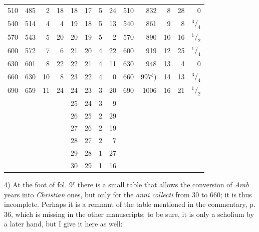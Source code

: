 \documentclass[11pt]{article}
\newcommand{\Pg}[1]{\marginpar{\footnotesize\color{gray}#1}}
\begin{document}
\begin{center}
\begin{tabular}{rrrr|rrrr|rrrrr}
510 & 485 & 2 & 18 & 18 & 17 & 5 & 24 & 510 & 832 & 8 & 28 & 0 \\
540 & 514 & 4 & 4 & 19 & 18 & 5 & 13 & 540 & 861 & 9 & 8 & $^{3}/_{4}$ \\
570 & 543 & 5 & 20 & 20 & 19 & 5 & 2 & 570 & 890 & 10 & 16 & $^{1}/_{2}$ \\
600 & 572 & 7 & 6 & 21 & 20 & 4 & 22 & 600 & 919 & 12 & 25 & $^{1}/_{4}$ \\
630 & 601 & 8 & 22 & 22 & 21 & 4 & 11 & 630 & 948 & 13 & 4 & 0 \\
660 & 630 & 10 & 8 & 23 & 22 & 4 & 0 & 660 & 997$^{b}$) & 14 & 13 & $^{3}/_{4}$ \\
690 & 659 & 11 & 24 & 24 & 23 & 3 & 20 & 690 & 1006 & 16 & 21 & $^{1}/_{2}$ \\
 &  &  &  & 25 & 24 & 3 & 9 &  &  &  &  &  \\
 &  &  &  & 26 & 25 & 2 & 29 &  &  &  &  &  \\
 &  &  &  & 27 & 26 & 2 & 19 &  &  &  &  &  \\
 &  &  &  & 28 & 27 & 2 & 7 &  &  &  &  &  \\
 &  &  &  & 29 & 28 & 1 & 27 &  &  &  &  &  \\
 &  &  &  & 30 & 29 & 1 & 16 &  &  &  &  &  \\
\end{tabular}\end{center}
\addtocounter{footnoteT}{-1}
\par \Pg{XVII}4) At the foot of fol. 9$^{r}$ there is a small table that allows the conversion of \emph{Arab} years into \emph{Christian} ones, but only for the \emph{anni collecti} from 30 to 660; it is thus incomplete. Perhaps it is a remnant of the table mentioned in the commentary, p. 36, which is missing in the other manuscripts; to be sure, it is only a scholium by a later hand, but I give it here as well:\par
\end{document}
